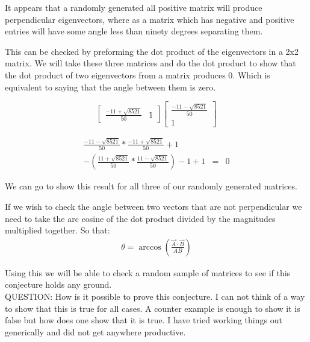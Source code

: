 \documentclass[12pt]{article}
\begin{document}
\clearpage

It appears that a randomly generated all positive matrix will produce perpendicular eigenvectors, where as a matrix which has negative and positive entries will have some angle less than ninety degrees separating them.

This can be checked by preforming the dot product of the eigenvectors in a 2x2 matrix. We will take these three matrices and do the dot product to show that the dot product of two eigenvectors from a matrix produces 0. Which is equivalent to saying that the angle between them is zero.

\[
\begin{bmatrix}
\frac{-11+\sqrt{8521}}{50} & 1
\end{bmatrix}
\begin{bmatrix}
\frac{-11-\sqrt{8521}}{50}\\
1
\end{bmatrix}
\]

\begin{eqnarray*}
\frac{-11-\sqrt{8521}}{50}*\frac{-11+\sqrt{8521}}{50} + 1\\
-(\frac{11+\sqrt{8521}}{50}*\frac{11-\sqrt{8521}}{50})
-1 + 1 &=& 0
\end{eqnarray*}

We can go to show this result for all three of our randomly generated matrices.

If we wish to check the angle between two vectors that are not perpendicular we need to take the arc cosine of the dot product divided by the magnitudes multiplied together. So that:
\begin{eqnarray*}
\theta = \arccos(\frac{\vec{A} \cdot \vec{B}}{AB})
\end{eqnarray*}

Using this we will be able to check a random sample of matrices to see if this conjecture holds any ground.\\

QUESTION:
How is it possible to prove this conjecture. I can not think of a way to show that this is true for all cases. A counter example is enough to show it is false but how does one show that it is true. I have tried working things out generically and did not get anywhere productive.
\end{document}

